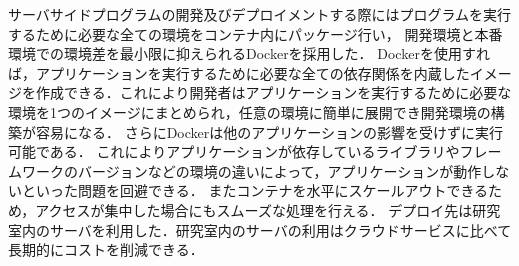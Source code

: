 サーバサイドプログラムの開発及びデプロイメントする際にはプログラムを実行するために必要な全ての環境をコンテナ内にパッケージ行い，
開発環境と本番環境での環境差を最小限に抑えられるDockerを採用した．
Dockerを使用すれば，アプリケーションを実行するために必要な全ての依存関係を内蔵したイメージを作成できる．これにより開発者はアプリケーションを実行するために必要な環境を1つのイメージにまとめられ，任意の環境に簡単に展開でき開発環境の構築が容易になる．
さらにDockerは他のアプリケーションの影響を受けずに実行可能である．
これによりアプリケーションが依存しているライブラリやフレームワークのバージョンなどの環境の違いによって，アプリケーションが動作しないといった問題を回避できる．
またコンテナを水平にスケールアウトできるため，アクセスが集中した場合にもスムーズな処理を行える．
デプロイ先は研究室内のサーバを利用した．研究室内のサーバの利用はクラウドサービスに比べて長期的にコストを削減できる．





